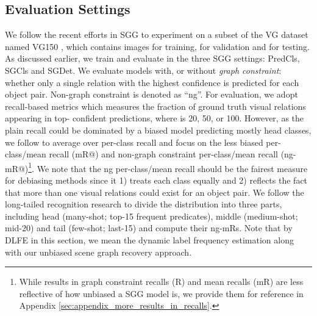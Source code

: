 \documentclass[sigconf]{acmart}
\begin{document}
\subsection{Evaluation Settings}
\label{sec:eval_setting}
We follow the recent efforts in SGG \cite{zellers2018neural,chen2019knowledge} to experiment on a subset of the VG dataset \cite{krishna2017visual} named VG150 \cite{xu2017scene}, which contains  images for training,  for validation and  for testing.
As discussed earlier, we train and evaluate in the three SGG settings: PredCls, SGCls and SGDet.
We evaluate models with, or without \textit{graph constraint}: whether only a single relation with the highest confidence is predicted for each object pair.
Non-graph constraint is denoted as ``ng''.
For evaluation, we adopt recall-based metrics which measures the fraction of ground truth visual relations appearing in top- confident predictions, where  is 20, 50, or 100.
However, as the plain recall could be dominated by a biased model predicting mostly head classes, we follow \cite{chen2019knowledge,tang2019learning,yan2020pcpl,DBLP:conf/bmvc/WangPL20} to average over per-class recall and focus on the less biased per-class/mean recall (mR@) and non-graph constraint per-class/mean recall (ng-mR@)\footnote{While results in graph constraint recalls (R) and mean recalls (mR) are less reflective of how unbiased a SGG model is, we provide them for reference in Appendix \ref{sec:appendix_more_results_in_recalls}.}.
We note that the ng per-class/mean recall should be the fairest measure for debiasing methods since it 1) treats each class equally and 2) reflects the fact that more than one visual relations could exist for an object pair.
We follow the long-tailed recognition research \cite{liu2019large} to divide the distribution into three parts, including head (many-shot; top-15 frequent predicates), middle (medium-shot; mid-20) and tail (few-shot; last-15) and compute their ng-mRs.
Note that by DLFE in this section, we mean the dynamic label frequency estimation along with our unbiased scene graph recovery approach.
\end{document}

